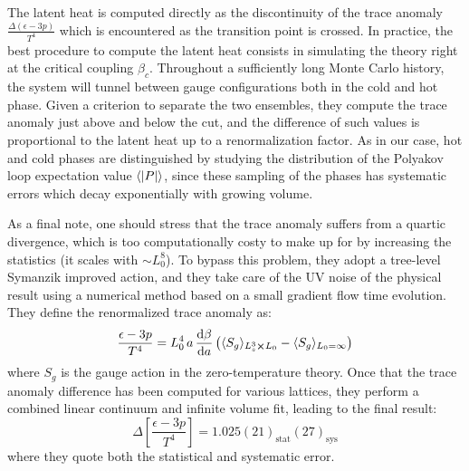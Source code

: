 \documentclass{article}
\begin{document}
The latent heat is computed directly as the discontinuity of the trace anomaly $\frac{\Delta(\epsilon - 3p)}{T^4}$ which is encountered as the transition point is crossed.
In practice, the best procedure to compute the latent heat consists in simulating the theory right at the critical coupling $\beta_c$. Throughout a sufficiently long Monte Carlo history, the system will tunnel between gauge configurations both in the cold and hot phase. Given a criterion to separate the two ensembles, they compute the trace anomaly just above and below the cut, and the difference of such values is proportional to the latent heat up to a renormalization factor. As in our case, hot and cold phases are distinguished by studying the distribution of the Polyakov loop expectation value $\langle \abs{P} \rangle$, since these sampling of the phases has systematic errors which decay exponentially with growing volume.

As a final note, one should stress that the trace anomaly suffers from a quartic divergence, which is too computationally costy to make up for by increasing the statistics (it scales with $\sim L_0^8$). To bypass this problem, they adopt a tree-level Symanzik improved action, and they take care of the UV noise of the physical result using a numerical method based on a small gradient flow time evolution.
They define the renormalized trace anomaly as:
\begin{equation}
    \frac{\epsilon - 3p}{T^4} = L_0^4 \, a \, \dv{\beta}{a} \left( \langle S_g \rangle_{L_s^3 \cross L_0} - \langle S_g \rangle_{L_0 = \infty}  \right)
\end{equation}
where $S_g$ is the gauge action in the zero-temperature theory.
Once that the trace anomaly difference has been computed for various lattices, they perform a combined linear continuum and infinite volume fit, leading to the final result:
\begin{equation}
    \Delta \left[ \frac{\epsilon - 3p}{T^4}\right] = 1.025(21)_{\textrm{stat}}(27)_{\textrm{sys}}
\end{equation}
where they quote both the statistical and systematic error.
\printbibliography
\end{document}
